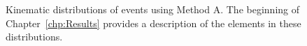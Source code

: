\begin{figure}[h!]
\caption{Kinematic distributions of \phoonejet events using Method A. The beginning of Chapter~\ref{chp:Results} provides a description of the elements in these distributions.}
\label{fig:pjSetOne}
\end{figure}
\clearpage

